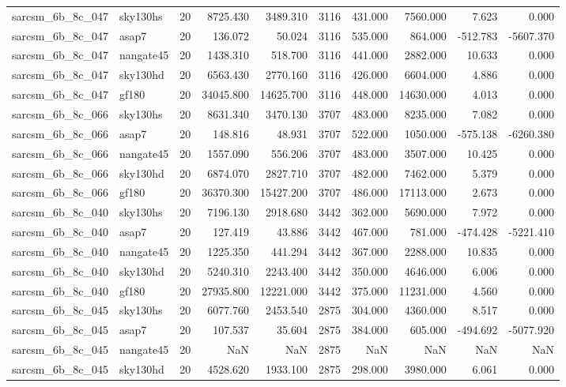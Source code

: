 \begin{tabular}{llrrrrrrrr}
sarcsm\_6b\_8c\_047 & sky130hs & 20 & 8725.430 & 3489.310 & 3116 & 431.000 & 7560.000 & 7.623 & 0.000 \\
sarcsm\_6b\_8c\_047 & asap7 & 20 & 136.072 & 50.024 & 3116 & 535.000 & 864.000 & -512.783 & -5607.370 \\
sarcsm\_6b\_8c\_047 & nangate45 & 20 & 1438.310 & 518.700 & 3116 & 441.000 & 2882.000 & 10.633 & 0.000 \\
sarcsm\_6b\_8c\_047 & sky130hd & 20 & 6563.430 & 2770.160 & 3116 & 426.000 & 6604.000 & 4.886 & 0.000 \\
sarcsm\_6b\_8c\_047 & gf180 & 20 & 34045.800 & 14625.700 & 3116 & 448.000 & 14630.000 & 4.013 & 0.000 \\
sarcsm\_6b\_8c\_066 & sky130hs & 20 & 8631.340 & 3470.130 & 3707 & 483.000 & 8235.000 & 7.082 & 0.000 \\
sarcsm\_6b\_8c\_066 & asap7 & 20 & 148.816 & 48.931 & 3707 & 522.000 & 1050.000 & -575.138 & -6260.380 \\
sarcsm\_6b\_8c\_066 & nangate45 & 20 & 1557.090 & 556.206 & 3707 & 483.000 & 3507.000 & 10.425 & 0.000 \\
sarcsm\_6b\_8c\_066 & sky130hd & 20 & 6874.070 & 2827.710 & 3707 & 482.000 & 7462.000 & 5.379 & 0.000 \\
sarcsm\_6b\_8c\_066 & gf180 & 20 & 36370.300 & 15427.200 & 3707 & 486.000 & 17113.000 & 2.673 & 0.000 \\
sarcsm\_6b\_8c\_040 & sky130hs & 20 & 7196.130 & 2918.680 & 3442 & 362.000 & 5690.000 & 7.972 & 0.000 \\
sarcsm\_6b\_8c\_040 & asap7 & 20 & 127.419 & 43.886 & 3442 & 467.000 & 781.000 & -474.428 & -5221.410 \\
sarcsm\_6b\_8c\_040 & nangate45 & 20 & 1225.350 & 441.294 & 3442 & 367.000 & 2288.000 & 10.835 & 0.000 \\
sarcsm\_6b\_8c\_040 & sky130hd & 20 & 5240.310 & 2243.400 & 3442 & 350.000 & 4646.000 & 6.006 & 0.000 \\
sarcsm\_6b\_8c\_040 & gf180 & 20 & 27935.800 & 12221.000 & 3442 & 375.000 & 11231.000 & 4.560 & 0.000 \\
sarcsm\_6b\_8c\_045 & sky130hs & 20 & 6077.760 & 2453.540 & 2875 & 304.000 & 4360.000 & 8.517 & 0.000 \\
sarcsm\_6b\_8c\_045 & asap7 & 20 & 107.537 & 35.604 & 2875 & 384.000 & 605.000 & -494.692 & -5077.920 \\
sarcsm\_6b\_8c\_045 & nangate45 & 20 & NaN & NaN & 2875 & NaN & NaN & NaN & NaN \\
sarcsm\_6b\_8c\_045 & sky130hd & 20 & 4528.620 & 1933.100 & 2875 & 298.000 & 3980.000 & 6.061 & 0.000 \\

\end{tabular}
